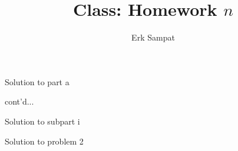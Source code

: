 \title{{\selectfont Class: } Homework $n$}
\author{Erk Sampat}



\maketitle
\prob
\begin{ppart}
	Solution to part a
	
	cont'd...
\end{ppart}
\begin{ppart}
	\begin{spart}
		Solution to subpart i
	\end{spart}
\end{ppart}
\prob
Solution to problem 2

